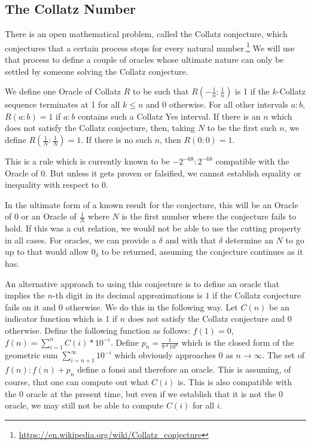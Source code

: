 \documentclass[12pt]{article}
\begin{document}
\subsection{The Collatz Number}

There is an open mathematical problem, called the Collatz conjecture, which conjectures that a certain process stops for every natural number.\footnote{\url{https://en.wikipedia.org/wiki/Collatz_conjecture}} We will use that process to define a couple of oracles whose ultimate nature can only be settled by someone solving the Collatz conjecture. 

We define one Oracle of Collatz $R$ to be such that $R(-\tfrac{1}{n}:\tfrac{1}{n})$ is 1 if the $k$-Collatz sequence terminates at 1 for all $k \leq n$ and 0 otherwise. For all other intervals $a:b$, $R(a:b) = 1$ if $a:b$ contains such a Collatz Yes interval. If there is an $n$ which does not satisfy the Collatz conjecture, then, taking $N$ to be the first such $n$, we define $R(\tfrac{1}{N}:\tfrac{1}{N}) = 1$. If there is no such $n$, then $R(0:0) = 1$.

This is a rule which is currently known to be $-2^{-68}:2^{-68}$ compatible with the Oracle of 0. But unless it gets proven or falsified, we cannot establish equality or inequality with respect to 0. 

In the ultimate form of a known result for the conjecture, this will be an Oracle of 0 or an Oracle of $\tfrac{1}{N}$ where $N$ is the first number where the conjecture fails to hold. If this was a cut relation, we would not be able to use the cutting property in all cases. For oracles, we can provide a $\delta$ and with that $\delta$ determine an $N$ to go up to that would allow $0_\delta$ to be returned, assuming the conjecture continues as it has. 

An alternative approach to using this conjecture is to define an oracle that implies the $n$-th digit in its decimal approximations is $1$ if the Collatz conjecture fails on it and $0$ otherwise. We do this in the following way. Let $C(n)$ be an indicator function which is 1 if $n$ does not satisfy the Collatz conjecture and 0 otherwise. Define the following function as follows: $f(1) = 0$,  $f(n) = \sum_{i=1}^n C(i)*10^{-i} $. Define $p_n = \frac{1}{9*10^n}$ which is the closed form of the geometric sum $\sum_{i=n+1}^{\infty} 10^{-i}$ which obviously approaches $0$ as $n \to \infty$. The set of $f(n): f(n) + p_n $ define a fonsi and therefore an oracle. This is assuming, of course, that one can compute out what $C(i)$ is. This is also compatible with the 0 oracle at the present time, but even if we establish that it is not the 0 oracle, we may still not be able to compute $C(i)$ for all $i$. 
\end{document}
